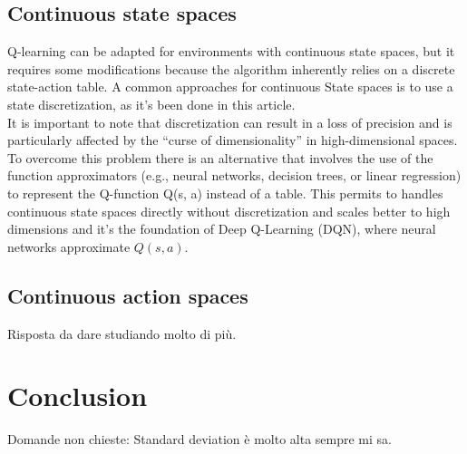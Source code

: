 \documentclass{article}
\begin{document}
\subsection{Continuous state spaces}
Q-learning can be adapted for environments with continuous state spaces, but it requires some modifications because the algorithm inherently relies on a discrete state-action table. A common approaches for continuous State spaces
is to use a state discretization, as it's been done in this article. \\
It is important to note that discretization can result in a loss of precision and is particularly affected by the “curse of dimensionality”\cite{BELLMAN1958228} in high-dimensional spaces. \\
To overcome this problem there is an alternative that involves the use of the function approximators (e.g., neural networks, decision trees, or linear regression) to represent the Q-function Q(s, a) instead of a table. This permits to handles continuous state spaces directly without discretization and scales better to high dimensions and it's the foundation of Deep Q-Learning (DQN), where neural networks approximate $ Q(s, a) $.
 
\subsection{Continuous action spaces}
Risposta da dare studiando molto di più.



\section{Conclusion}

Domande non chieste:
Standard deviation è molto alta sempre mi sa.

\label{sec:conclusion}


\end{document}
